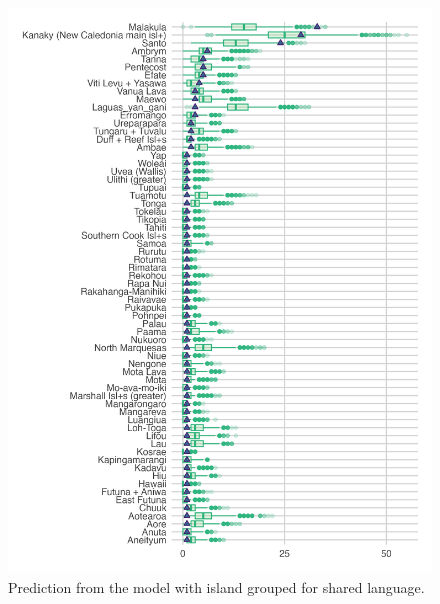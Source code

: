 \documentclass[a4paper,10pt]{article} %
\begin{document}
\begin{figure}[ht]
\centering
\includegraphics[width=\textwidth]{brms_predict_medium.png}
\caption{Prediction from the model with island grouped for shared language.}
\label{medium_model_predict}
\end{figure}
\end{document}
